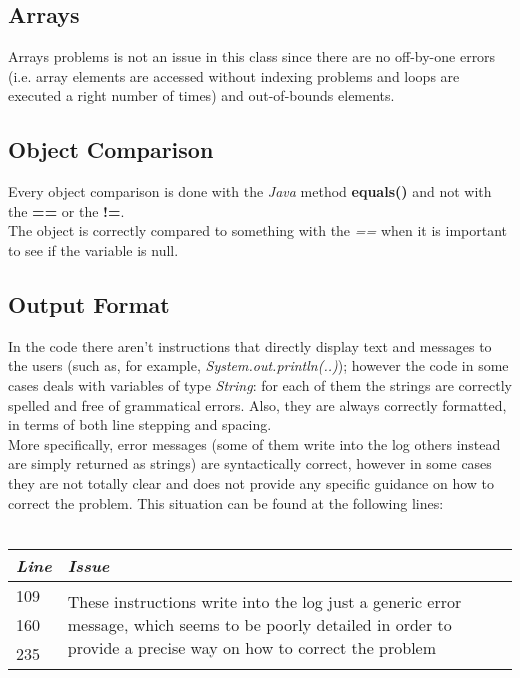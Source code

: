 \documentclass[11pt,a4paper]{report}
\begin{document}
\subsection{Arrays}
Arrays problems is not an issue in this class since there are no off-by-one errors (i.e. array elements are accessed without indexing problems and loops are executed a right number of times) and out-of-bounds elements.
\subsection{Object Comparison}
Every object comparison is done with the \textit{Java} method \textbf{equals()} and not with the \textbf{==} or the \textbf{!=}.\\The object is correctly compared to something with the \textit{==} when it is important to see if the variable is null.
\subsection{Output Format}
In the code there aren't instructions that directly display text and messages to the users (such as, for example, \textit{System.out.println(..)}); however the code in some cases deals with variables of type \textit{String}: for each of them the strings are correctly spelled and free of grammatical errors. Also, they are always correctly formatted, in terms of both line stepping and spacing.\\
More specifically, error messages (some of them write into the log others instead are simply returned as strings) are syntactically correct, however in some cases they are not totally clear and does not provide any specific guidance on how to correct the problem. This situation can be found at the following lines:\\
\\
\begin{tabularx}{\textwidth}{|l|X|}
	\hline
	\textit{Line} & \textit{Issue}\\
	\hline
	\hline
		109 & \multirow{3}{\linewidth}{These instructions write into the log just a generic error message, which seems to be poorly detailed in order to provide a precise way on how to correct the problem}\\
		160 & \\
		235 & \\
	\hline
\end{tabularx}
\end{document}
